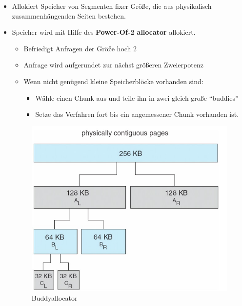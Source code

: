 \documentclass[a4paper]{scrreprt}
\begin{document}
\begin{itemize}
\item Allokiert Speicher von Segmenten fixer Größe, die aus physikalisch zusammenhängenden Seiten bestehen.
\item Speicher wird mit Hilfe des \textbf{Power-Of-2 allocator} allokiert.
\begin{itemize}
\item Befriedigt Anfragen der Größe hoch 2
\item Anfrage wird aufgerundet zur nächst größeren Zweierpotenz
\item Wenn nicht genügend kleine Speicherblöcke vorhanden sind:
\begin{itemize}
\item Wähle einen Chunk aus und teile ihn in zwei gleich große "`buddies"'
\item Setze das Verfahren fort bis ein angemessener Chunk vorhanden ist.

\end{itemize}
\end{itemize}
\begin{figure}[ht]
\centering
\includegraphics[scale=0.4]{graphics/buddyallocator.png}
\caption{Buddyallocator}
\end{figure}
\end{itemize}

\newpage
\end{document}
